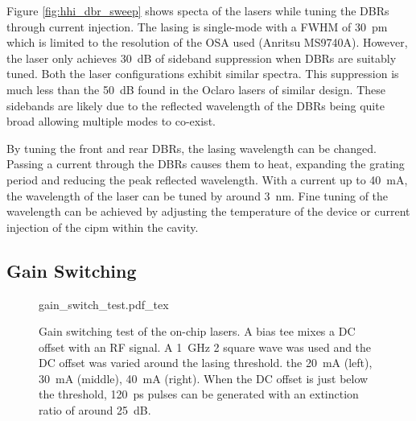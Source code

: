 Figure \ref{fig:hhi_dbr_sweep} shows specta of the lasers while tuning the \acp{DBR} through current injection. The lasing is single-mode with a \ac{FWHM} of \SI{30}{pm} which is limited to the resolution of the \ac{OSA} used (Anritsu MS9740A). However, the laser only achieves \SI{30}{dB} of sideband suppression when \acp{DBR} are suitably tuned. Both the laser configurations exhibit similar spectra. This suppression is much less than the \SI{50}{dB} found in the Oclaro lasers of similar design. These sidebands are likely due to the reflected wavelength of the \acp{DBR} being quite broad allowing multiple modes to co-exist. 

By tuning the front and rear \acp{DBR}, the lasing wavelength can be changed. Passing a current through the \acp{DBR} causes them to heat, expanding the grating period and reducing the peak reflected wavelength. With a current up to \SI{40}{\mA}, the wavelength of the laser can be tuned by around \SI{3}{nm}. Fine tuning of the wavelength can be achieved by adjusting the temperature of the device or current injection of the \ac{cipm} within the cavity. 



\subsection{Gain Switching}

\begin{figure}[tp]
	\centering
	\small	
	\def\svgwidth{\textwidth} 
	{gain_switch_test.pdf_tex}
	\caption[Gain switching test of the HHI on-chip lasers]{Gain switching test of the on-chip lasers. A bias tee mixes a DC offset with an RF signal. A \SI{1}{GHz} \SI{2}{\Vpp} square wave was used and the DC offset was varied around the lasing threshold. the \SI{20}{mA} (left), \SI{30}{\mA} (middle), \SI{40}{\mA} (right). When the DC offset is just below the threshold, \SI{120}{ps} pulses can be generated with an extinction ratio of around \SI{25}{dB}.}
	\label{fig:gain_switch_test}
\end{figure}

